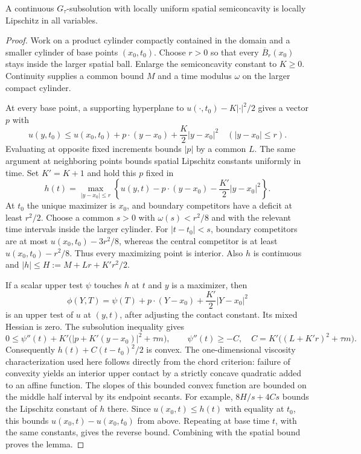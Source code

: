 \begin{lemma}\label{lem:time-lipschitz}
A continuous $G_\tau$-subsolution with locally uniform spatial
semiconcavity is locally Lipschitz in all variables.
\end{lemma}
\begin{proof}
Work on a product cylinder compactly contained in the domain and a
smaller cylinder of base points $(x_0,t_0)$. Choose $r>0$ so that every
$\overline B_r(x_0)$ stays inside the larger spatial ball. Enlarge the
semiconcavity constant to $K\geq0$. Continuity supplies a common bound
$M$ and a time modulus $\omega$ on the larger compact cylinder.

At every base point, a supporting hyperplane to
$u(\cdot,t_0)-K|\cdot|^2/2$ gives a vector $p$ with
\[
 u(y,t_0)\leq u(x_0,t_0)+p\cdot(y-x_0)+\frac K2|y-x_0|^2
 \quad (|y-x_0|\leq r).
\]
Evaluating at opposite fixed increments bounds $|p|$ by a common $L$.
The same argument at neighboring points bounds spatial Lipschitz
constants uniformly in time. Set $K'=K+1$ and hold this $p$ fixed in
\[
 h(t)=\max_{|y-x_0|\leq r}
 \left\{u(y,t)-p\cdot(y-x_0)-\frac{K'}2|y-x_0|^2\right\}.
\]
At $t_0$ the unique maximizer is $x_0$, and boundary competitors have
a deficit at least $r^2/2$. Choose a common $s>0$ with
$\omega(s)<r^2/8$ and with the relevant time intervals inside the
larger cylinder. For $|t-t_0|<s$, boundary competitors are at most
$u(x_0,t_0)-3r^2/8$, whereas the central competitor is at least
$u(x_0,t_0)-r^2/8$. Thus every maximizing point is interior. Also
$h$ is continuous and $|h|\leq H:=M+Lr+K'r^2/2$.

If a scalar upper test $\psi$ touches $h$ at $t$ and $y$ is a maximizer,
then
\[
 \phi(Y,T)=\psi(T)+p\cdot(Y-x_0)+\frac{K'}2|Y-x_0|^2
\]
is an upper test of $u$ at $(y,t)$, after adjusting the contact constant.
Its mixed Hessian is zero. The subsolution inequality gives
\[
 0\leq\psi''(t)+K'\bigl(|p+K'(y-x_0)|^2+\tau m\bigr),
 \qquad \psi''(t)\geq-C,
 \quad C=K'\bigl((L+K'r)^2+\tau m\bigr).
\]
Consequently $h(t)+C(t-t_0)^2/2$ is convex. The one-dimensional
viscosity characterization used here follows directly from the chord
criterion: failure of convexity yields an interior upper contact by a
strictly concave quadratic added to an affine function.
The slopes of this bounded convex function are bounded on the middle
half interval by its endpoint secants. For example, $8H/s+4Cs$ bounds
the Lipschitz constant of $h$ there. Since
$u(x_0,t)\leq h(t)$ with equality at $t_0$, this bounds
$u(x_0,t)-u(x_0,t_0)$ from above. Repeating at base time $t$, with the
same constants, gives the reverse bound. Combining with the spatial
bound proves the lemma.
\end{proof}

